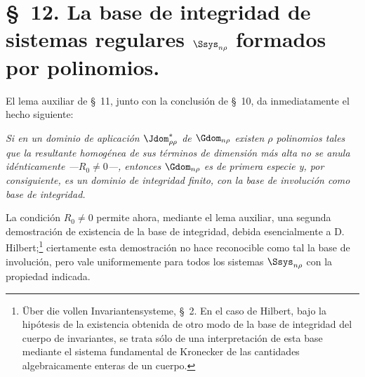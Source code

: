 \documentclass[11pt]{article}
\begin{document}
\section*{\S\ 12. La base de integridad de sistemas regulares $\Ssys_{n\rho}$ formados por polinomios.}

El lema auxiliar de \S\ 11, junto con la conclusión de \S\ 10, da inmediatamente el hecho siguiente:

\emph{Si en un dominio de aplicación $\Jdom^*_{\rho\rho}$ de $\Gdom_{n\rho}$ existen $\rho$ polinomios tales que la resultante homogénea de sus términos de dimensión más alta no se anula idénticamente ---$R_0\ne0$---, entonces $\Gdom_{n\rho}$ es de primera especie y, por consiguiente, es un dominio de integridad finito, con la base de involución como base de integridad.}

La condición $R_0\ne0$ permite ahora, mediante el lema auxiliar, una segunda demostración de existencia de la base de integridad, debida esencialmente a D. Hilbert;\footnote{Über die vollen Invariantensysteme, \S\ 2. En el caso de Hilbert, bajo la hipótesis de la existencia obtenida de otro modo de la base de integridad del cuerpo de invariantes, se trata sólo de una interpretación de esta base mediante el sistema fundamental de Kronecker de las cantidades algebraicamente enteras de un cuerpo.} ciertamente esta demostración no hace reconocible como tal la base de involución, pero vale uniformemente para todos los sistemas $\Ssys_{n\rho}$ con la propiedad indicada.
\end{document}
